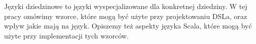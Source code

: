 Języki dziedzinowe to języki wyspecjalizowane dla konkretnej dziedziny.
W tej pracy omówimy wzorce, które mogą być użyte przy projektowaniu DSLa, oraz wpływ jakie mają na język.
Opiszemy też aspekty języka Scala, które mogą być użyte przy implementacji tych wzorców.
